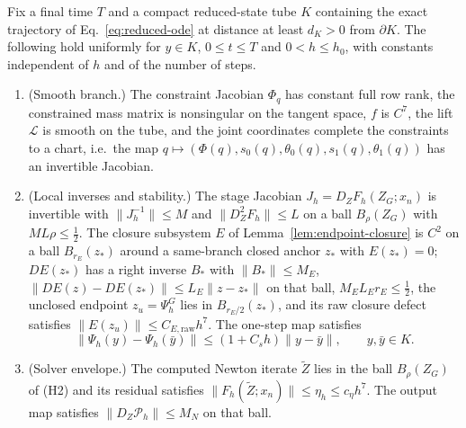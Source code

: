 \begin{assumption}
\label{ass:regularity}
Fix a final time $T$ and a compact reduced-state tube $K$ containing the exact trajectory of
Eq.~\eqref{eq:reduced-ode} at distance at least $d_K>0$ from $\partial K$. The following hold
uniformly for $y\in K$, $0\le t\le T$ and $0<h\le h_0$, with constants independent of $h$ and of
the number of steps.
\begin{enumerate}
  \item[(H1)] (Smooth branch.) The constraint Jacobian $\Phi_q$ has constant full row rank, the
  constrained mass matrix is nonsingular on the tangent space, $f$ is $C^7$, the lift $\mathcal L$
  is smooth on the tube, and the joint coordinates complete the constraints to a chart, i.e.\ the
  map $q\mapsto(\Phi(q),s_0(q),\theta_0(q),s_1(q),\theta_1(q))$ has an invertible Jacobian.
  \item[(H2)] (Local inverses and stability.) The stage Jacobian $J_h=D_ZF_h(Z_G;x_n)$ is
  invertible with $\|J_h^{-1}\|\le M$ and $\|D_Z^2F_h\|\le L$ on a ball $B_\rho(Z_G)$ with
  $ML\rho\le\tfrac12$. The closure subsystem $E$ of Lemma~\ref{lem:endpoint-closure} is $C^2$ on a
  ball $B_{r_E}(z_\ast)$ around a same-branch closed anchor $z_\ast$ with $E(z_\ast)=0$;
  $DE(z_\ast)$ has a right inverse $B_\ast$ with $\|B_\ast\|\le M_{E}$,
  $\|DE(z)-DE(z_\ast)\|\le L_E\|z-z_\ast\|$ on that ball, $M_{E}L_Er_E\le\tfrac12$, the unclosed
  endpoint $z_u=\Psi_h^G$ lies in $B_{r_E/2}(z_\ast)$, and its raw closure defect satisfies
  $\|E(z_u)\|\le C_{E,\mathrm{raw}}h^7$. The one-step map satisfies
  \begin{equation}
  \label{eq:assumption-stability-scale}
    \|\Psi_h(y)-\Psi_h(\bar y)\|\le (1+C_sh)\|y-\bar y\|,\qquad y,\bar y\in K .
  \end{equation}
  \item[(H3)] (Solver envelope.) The computed Newton iterate $\widetilde Z$ lies in the ball
  $B_\rho(Z_G)$ of (H2) and its residual satisfies $\|F_h(\widetilde Z;x_n)\|\le\eta_h\le c_\eta h^7$.
  The output map satisfies $\|D_Z\mathcal P_h\|\le M_N$ on that ball.
\end{enumerate}
\end{assumption}

